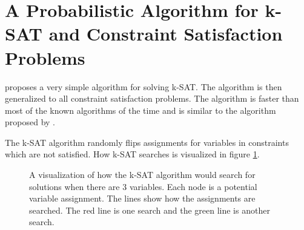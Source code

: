\documentclass[msc,lith,english]{liuthesis}
\begin{document}
\section{A Probabilistic Algorithm for k-SAT and Constraint Satisfaction Problems}
\citeauthor{sourceProbAlgo} proposes a very simple algorithm for solving k-SAT.
The algorithm is then generalized to all constraint satisfaction problems. The
algorithm is faster than most of the known algorithms of the time and is
similar to the algorithm proposed by \citeauthor{sourceNoRainbow} \cite{sourceNoRainbow}.

The k-SAT algorithm randomly flips assignments for variables in constraints which are not satisfied.
How k-SAT searches is visualized in figure \ref{figKSATSearch}.

\cite{sourceProbAlgo}

\begin{center}
\begin{figure}[h]
\centering
{}
\caption{A visualization of how the k-SAT algorithm would search for solutions when there are 3 variables. Each node is a potential variable assignment. The lines show how the assignments are searched. The red line is one search and the green line is another search.}
\label{figKSATSearch}
\end{figure}
\end{center}
\end{document}
